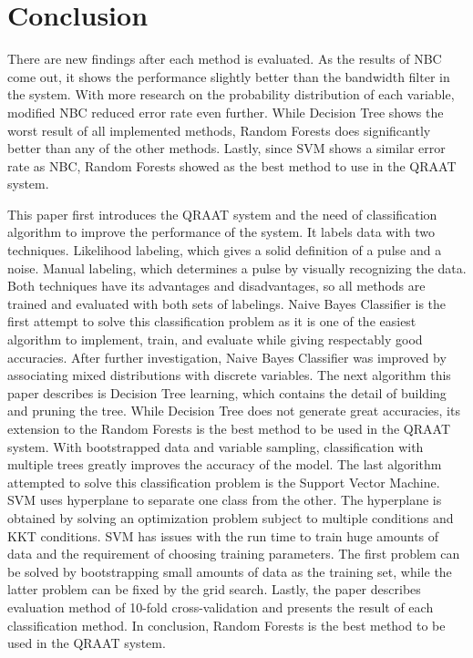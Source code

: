 \documentclass[twoside]{article}
\begin{document}

\section{Conclusion}
There are new findings after each method is evaluated. As the results of NBC come out, it shows the performance slightly better than the bandwidth filter in the system. With more research on the probability distribution of each variable, modified NBC reduced error rate even further. While Decision Tree shows the worst result of all implemented methods, Random Forests does significantly better than any of the other methods. Lastly, since SVM shows a similar error rate as NBC, Random Forests showed as the best method to use in the QRAAT system. 

This paper first introduces the QRAAT system and the need of classification algorithm to improve the performance of the system. It labels data with two techniques. Likelihood labeling, which gives a solid definition of a pulse and a noise. Manual labeling, which determines a pulse by visually recognizing the data. Both techniques have its advantages and disadvantages, so all methods are trained and evaluated with both sets of labelings. Naive Bayes Classifier is the first attempt to solve this classification problem as it is one of the easiest algorithm to implement, train, and evaluate while giving respectably good accuracies. After further investigation, Naive Bayes Classifier was improved by associating mixed distributions with discrete variables. The next algorithm this paper describes is Decision Tree learning, which contains the detail of building and pruning the tree. While Decision Tree does not generate great accuracies, its extension to the Random Forests is the best method to be used in the QRAAT system. With bootstrapped data and variable sampling, classification with multiple trees greatly improves the accuracy of the model. The last algorithm attempted to solve this classification problem is the Support Vector Machine. SVM uses hyperplane to separate one class from the other. The hyperplane is obtained by solving an optimization problem subject to multiple conditions and KKT conditions. SVM has issues with the run time to train huge amounts of data and the requirement of choosing training parameters. The first problem can be solved by bootstrapping small amounts of data as the training set, while the latter problem can be fixed by the grid search. Lastly, the paper describes evaluation method of 10-fold cross-validation and presents the result of each classification method. In conclusion, Random Forests is the best method to be used in the QRAAT system.
\end{document}
